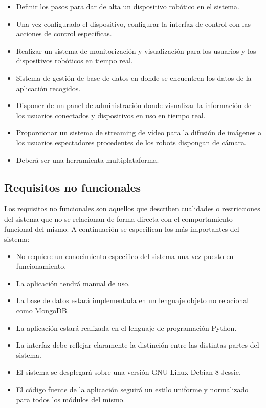 \begin{itemize}
  \item Definir los pasos para dar de alta un dispositivo robótico en el sistema.
  \item Una vez configurado el dispositivo, configurar la interfaz de control con las acciones de control específicas.
  \item Realizar un sistema de monitorización y visualización para los usuarios y los dispositivos robóticos en tiempo real.
  \item Sistema de gestión de base de datos en donde se encuentren los datos de la aplicación recogidos.
  \item Disponer de un panel de administración donde visualizar la información de los usuarios conectados y dispositivos en uso en tiempo real. 
  \item Proporcionar un sistema de streaming de vídeo para la difusión de imágenes a los usuarios espectadores procedentes de los robots dispongan de cámara.
  \item Deberá ser una herramienta multiplataforma.  
\end{itemize}



\subsection{Requisitos no funcionales}

Los requisitos no funcionales son aquellos que describen cualidades o restricciones del sistema que no se relacionan de forma directa con el comportamiento funcional del mismo. A continuación se especifican los más importantes del sistema:
\begin{itemize}
\item No requiere un conocimiento específico del sistema una vez puesto en funcionamiento.
\item La aplicación tendrá manual de uso.
\item La base de datos estará implementada en un lenguaje objeto no relacional como MongoDB.
\item La aplicación estará realizada en el lenguaje de programación Python.
\item La interfaz debe reflejar claramente la distinción entre las distintas partes del sistema.
\item El sistema se desplegará sobre una versión GNU Linux Debian 8 Jessie.
\item El código fuente de la aplicación seguirá un estilo uniforme y normalizado para todos los módulos del mismo.
\end{itemize}


